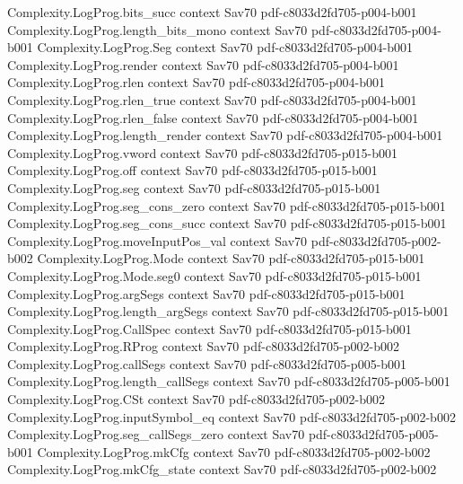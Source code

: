 \begin{theorem}
\proofstep
  {Complexity.LogProg.bits_succ}
  {context}
  {Sav70}
  {pdf-c8033d2fd705-p004-b001}
\proofstep
  {Complexity.LogProg.length_bits_mono}
  {context}
  {Sav70}
  {pdf-c8033d2fd705-p004-b001}
\proofstep
  {Complexity.LogProg.Seg}
  {context}
  {Sav70}
  {pdf-c8033d2fd705-p004-b001}
\proofstep
  {Complexity.LogProg.render}
  {context}
  {Sav70}
  {pdf-c8033d2fd705-p004-b001}
\proofstep
  {Complexity.LogProg.rlen}
  {context}
  {Sav70}
  {pdf-c8033d2fd705-p004-b001}
\proofstep
  {Complexity.LogProg.rlen_true}
  {context}
  {Sav70}
  {pdf-c8033d2fd705-p004-b001}
\proofstep
  {Complexity.LogProg.rlen_false}
  {context}
  {Sav70}
  {pdf-c8033d2fd705-p004-b001}
\proofstep
  {Complexity.LogProg.length_render}
  {context}
  {Sav70}
  {pdf-c8033d2fd705-p004-b001}
\proofstep
  {Complexity.LogProg.vword}
  {context}
  {Sav70}
  {pdf-c8033d2fd705-p015-b001}
\proofstep
  {Complexity.LogProg.off}
  {context}
  {Sav70}
  {pdf-c8033d2fd705-p015-b001}
\proofstep
  {Complexity.LogProg.seg}
  {context}
  {Sav70}
  {pdf-c8033d2fd705-p015-b001}
\proofstep
  {Complexity.LogProg.seg_cons_zero}
  {context}
  {Sav70}
  {pdf-c8033d2fd705-p015-b001}
\proofstep
  {Complexity.LogProg.seg_cons_succ}
  {context}
  {Sav70}
  {pdf-c8033d2fd705-p015-b001}
\proofstep
  {Complexity.LogProg.moveInputPos_val}
  {context}
  {Sav70}
  {pdf-c8033d2fd705-p002-b002}
\proofstep
  {Complexity.LogProg.Mode}
  {context}
  {Sav70}
  {pdf-c8033d2fd705-p015-b001}
\proofstep
  {Complexity.LogProg.Mode.seg0}
  {context}
  {Sav70}
  {pdf-c8033d2fd705-p015-b001}
\proofstep
  {Complexity.LogProg.argSegs}
  {context}
  {Sav70}
  {pdf-c8033d2fd705-p015-b001}
\proofstep
  {Complexity.LogProg.length_argSegs}
  {context}
  {Sav70}
  {pdf-c8033d2fd705-p015-b001}
\proofstep
  {Complexity.LogProg.CallSpec}
  {context}
  {Sav70}
  {pdf-c8033d2fd705-p015-b001}
\proofstep
  {Complexity.LogProg.RProg}
  {context}
  {Sav70}
  {pdf-c8033d2fd705-p002-b002}
\proofstep
  {Complexity.LogProg.callSegs}
  {context}
  {Sav70}
  {pdf-c8033d2fd705-p005-b001}
\proofstep
  {Complexity.LogProg.length_callSegs}
  {context}
  {Sav70}
  {pdf-c8033d2fd705-p005-b001}
\proofstep
  {Complexity.LogProg.CSt}
  {context}
  {Sav70}
  {pdf-c8033d2fd705-p002-b002}
\proofstep
  {Complexity.LogProg.inputSymbol_eq}
  {context}
  {Sav70}
  {pdf-c8033d2fd705-p002-b002}
\proofstep
  {Complexity.LogProg.seg_callSegs_zero}
  {context}
  {Sav70}
  {pdf-c8033d2fd705-p005-b001}
\proofstep
  {Complexity.LogProg.mkCfg}
  {context}
  {Sav70}
  {pdf-c8033d2fd705-p002-b002}
\proofstep
  {Complexity.LogProg.mkCfg_state}
  {context}
  {Sav70}
  {pdf-c8033d2fd705-p002-b002}

\end{theorem}
